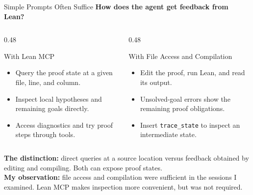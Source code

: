 \documentclass[aspectratio=169,xcolor=dvipsnames]{beamer}
\begin{document}
\begin{frame}{Simple Prompts Often Suffice}
    \small
    \textbf{How does the agent get feedback from Lean?}
    \begin{columns}[T,onlytextwidth]
        \begin{column}{0.48\textwidth}
            \begin{block}{With Lean MCP}
                \begin{itemize}
                    \item Query the proof state at a given file, line, and column.
                    \item Inspect local hypotheses and remaining goals directly.
                    \item Access diagnostics and try proof steps through tools.
                \end{itemize}
            \end{block}
        \end{column}
        \begin{column}{0.48\textwidth}
            \begin{block}{With File Access and Compilation}
                \begin{itemize}
                    \item Edit the proof, run Lean, and read its output.
                    \item Unsolved-goal errors show the remaining proof obligations.
                    \item Insert \texttt{trace\_state} to inspect an intermediate state.
                \end{itemize}
            \end{block}
        \end{column}
    \end{columns}
    \medskip
    \textbf{The distinction:} direct queries at a source location versus feedback
    obtained by editing and compiling. Both can expose proof states.\\[6pt]
    \textbf{My observation:} file access and compilation were sufficient in the
    sessions I examined. Lean MCP makes inspection more convenient, but was not required.
\end{frame}
\end{document}
